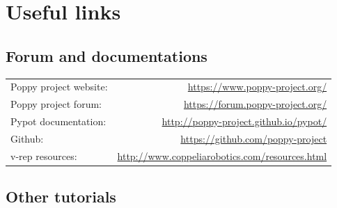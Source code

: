 \documentclass{article}
\begin{document}
%
%
%
%
%




\section{Useful links}
\label{documentation-links}

\subsection{Forum and documentations}

\begin{tabular}{lr}

Poppy project website: & \url{https://www.poppy-project.org/} \\ 

Poppy project forum: & \url{https://forum.poppy-project.org/} \\ 
 
Pypot documentation: & \url{http://poppy-project.github.io/pypot/} \\ 

Github: & \url{https://github.com/poppy-project} \\ 

v-rep resources: & \url{http://www.coppeliarobotics.com/resources.html} \\ 
\end{tabular} 

\subsection{Other tutorials}
\end{document}

